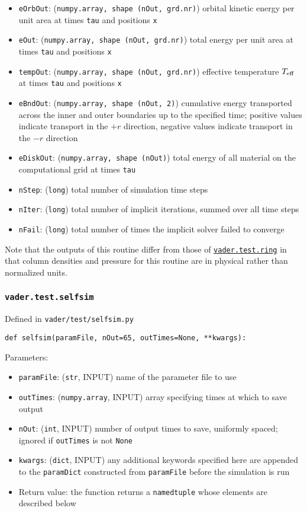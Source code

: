 \documentclass[12pt]{article}
\begin{document}
\begin{itemize}
\item \texttt{eOrbOut}: (\texttt{numpy.array, shape (nOut, grd.nr)}) orbital kinetic energy per unit area at times \verb=tau= and positions \verb=x=
\item \texttt{eOut}: (\texttt{numpy.array, shape (nOut, grd.nr)}) total energy per unit area at times \verb=tau= and positions \verb=x=
\item \texttt{tempOut}: (\texttt{numpy.array, shape (nOut, grd.nr)}) effective temperature $T_{\rm eff}$ at times \verb=tau= and positions \verb=x=
\item \texttt{eBndOut}: (\texttt{numpy.array, shape (nOut, 2)}) cumulative energy transported across the inner and outer boundaries up to the specified time; positive values indicate transport in the $+r$ direction, negative values indicate transport in the $-r$ direction
\item \texttt{eDiskOut}: (\texttt{numpy.array, shape (nOut)}) total energy of all material on the computational grid at times \verb=tau=
\item \texttt{nStep}: (\texttt{long}) total number of simulation time steps
\item \texttt{nIter}: (\texttt{long}) total number of implicit iterations, summed over all time steps
\item \texttt{nFail}: (\texttt{long}) total number of times the implicit solver failed to converge
\end{itemize}
Note that the outputs of this routine differ from those of \hyperref[sssec:vader.test.ring]{\texttt{vader.test.ring}} in that column densities and pressure for this routine are in physical rather than normalized units.


\subsubsection{\texttt{vader.test.selfsim}}
\label{sssec:vader.test.selfsim}

Defined in \verb=vader/test/selfsim.py=

\begin{verbatim}
def selfsim(paramFile, nOut=65, outTimes=None, **kwargs):
\end{verbatim}

Parameters:
\begin{itemize}
\item \texttt{paramFile}: (\texttt{str}, INPUT) name of the parameter file to use
\item \texttt{outTimes}: (\texttt{numpy.array}, INPUT) array specifying times at which to save output
\item \texttt{nOut}: (\texttt{int}, INPUT) number of output times to save, uniformly spaced; ignored if \texttt{outTimes} is not \texttt{None}
\item \verb=kwargs=: (\verb=dict=, INPUT) any additional keywords specified here are appended to the \texttt{paramDict} constructed from \texttt{paramFile} before the simulation is run
\item Return value: the function returns a \texttt{namedtuple} whose elements are described below
\end{itemize}
\end{document}
